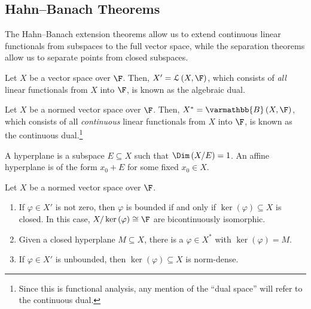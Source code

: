 \documentclass[10pt]{mypackage}
\renewcommand*{\mathbb}[1]{\varmathbb{#1}}
\newcommand{\B}{\mathbb{B}}
\begin{document}
  \subsection{Hahn--Banach Theorems}%
  The Hahn--Banach extension theorems allow us to extend continuous linear functionals from subspaces to the full vector space, while the separation theorems allow us to separate points from closed subspaces.
  \begin{definition}
    Let $X$ be a vector space over $\F$. Then, $X' = \mathcal{L}\left(X,\F\right)$, which consists of \textit{all} linear functionals from $X$ into $\F$, is known as the algebraic dual.
  \end{definition}
  \begin{definition}
    Let $X$ be a normed vector space over $\F$. Then, $X^{\ast} = \B\left(X,\F\right)$, which consists of all \textit{continuous} linear functionals from $X$ into $\F$, is known as the continuous dual.\footnote{Since this is functional analysis, any mention of the ``dual space'' will refer to the continuous dual.}
  \end{definition}
  \begin{definition}[Hyperplane]
    A hyperplane is a subspace $E\subseteq X$ such that $\Dim\left(X/E\right) = 1$. An affine hyperplane is of the form $x_0 + E$ for some fixed $x_0\in X$.
  \end{definition}
  \begin{proposition}
    Let $X$ be a normed vector space over $\F$.
    \begin{enumerate}[(1)]
      \item If $\varphi\in X'$ is not zero, then $\varphi$ is bounded if and only if $\ker\left(\varphi\right) \subseteq X$ is closed. In this case, $X/\ker\left(\varphi\right) \cong \F$ are bicontinuously isomorphic.
      \item Given a closed hyperplane $M\subseteq X$, there is a $\varphi\in X^{\ast}$ with $\ker\left(\varphi\right) = M$.
      \item If $\varphi\in X'$ is unbounded, then $\ker\left(\varphi\right)\subseteq X$ is norm-dense.
    \end{enumerate}
  \end{proposition}
\end{document}
